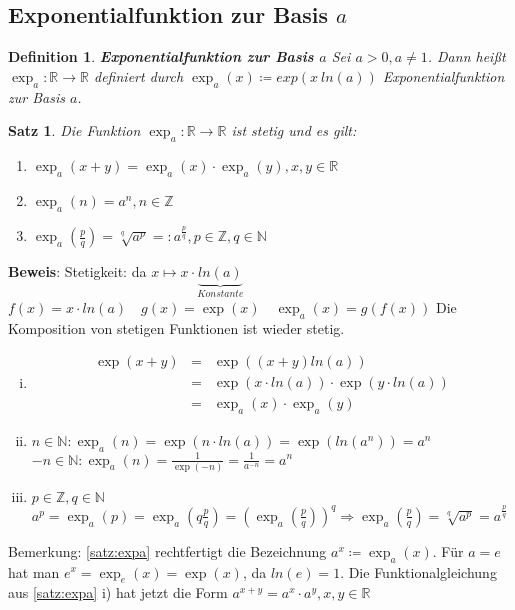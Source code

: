 \documentclass[ngerman,titlepage,twoside, parskip=half*]{scrreprt}
\newcommand*{\N}{\mathbb{N}}
\newcommand*{\Z}{\mathbb{Z}}
\newcommand*{\R}{\mathbb{R}}
\theoremstyle{break}
\newtheorem{theorem}{Satz}[section]
\newtheorem{definition}{Definition}[chapter]
\theoremstyle{nonumberbreak}
\begin{document}
\subsection{Exponentialfunktion zur Basis \texorpdfstring{$a$}{a}}

\begin{definition}
\textbf{Exponentialfunktion zur Basis $a$} Sei $a>0, a\neq 1$. Dann heißt $\exp_a \colon\R\rightarrow\R$ definiert durch $\exp_a (x)\coloneqq
exp(x\ ln (a))$ \emph{Exponentialfunktion} zur Basis $a$.
\end{definition}

\begin{theorem}
\label{satz:expa}
Die Funktion $\exp_a \colon\R\rightarrow\R$ ist stetig und es gilt:
\begin{enumerate}[i]
  \item $\exp_a(x+y)=\exp_a(x)\cdot \exp_a(y), x,y \in \R$
  \item $\exp_a(n)=a^n, n\in \Z$
  \item $\exp_a (\frac{p}{q})=\sqrt[q]{a^p}=:a^{\frac{p}{q}}, p\in \Z , q\in \N$
\end{enumerate}
\end{theorem}
\textbf{Beweis}: Stetigkeit: da $x \mapsto x \cdot \underbrace{ln (a)}_{Konstante}$\\
$f(x)=x\cdot ln(a)\quad g(x)=\exp(x)\quad \exp_a(x)=g(f(x))$ Die Komposition von stetigen Funktionen ist wieder stetig.
\begin{enumerate}[i)]
  \item \begin{align*}
    \exp(x+y) & = & \exp((x+y)ln (a))\\
    & = & \exp(x \cdot ln (a))\cdot \exp(y\cdot ln(a))\\
    & = & \exp_a(x)\cdot \exp_a(y)
  \end{align*}
  \item $n\in \N\colon \exp_a (n)=\exp(n\cdot ln(a))=\exp(ln(a^n))=a^n$\\
    $-n\in \N\colon \exp_a(n)=\frac{1}{\exp(-n)}=\frac{1}{a^{-n}}=a^n$
  \item $p\in \Z, q\in \N$\\
    $a^p=\exp_a(p)=\exp_a(q\frac{p}{q})=\left(\exp_a(\frac{p}{q})\right)^q\Rightarrow \exp_a(\frac{p}{q})=\sqrt[q]{a^p}=a^{\frac{p}{q}}$
\end{enumerate}

Bemerkung: \autoref{satz:expa} rechtfertigt die Bezeichnung $a^x\coloneqq \exp_a(x)$. Für $a=e$ hat man $e^x=\exp_e(x)=\exp(x)$, 
da $ln(e)=1$. Die Funktionalgleichung aus \autoref{satz:expa} i) hat jetzt die Form $a^{x+y}=a^x\cdot a^y, x,y\in \R$
\end{document}
